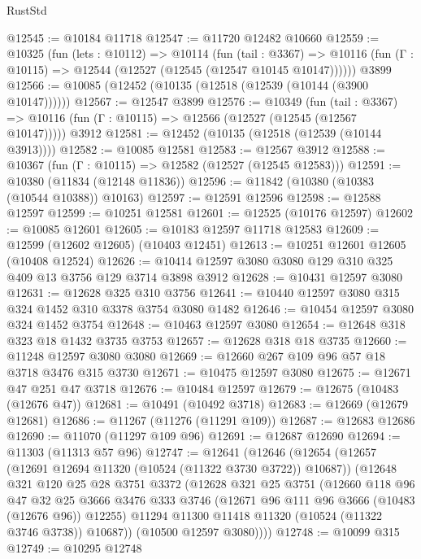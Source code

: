 \begin{lexlean}{RustStd}
\begin{coremodule}
@12545 := @10184 @11718
@12547 := @11720 @12482 @10660
@12559 := @10325
    (fun (lets : @10112) =>
    @10114
      (fun (tail : @3367) =>
      @10116 (fun (Γ : @10115) => @12544 (@12527 (@12545 (@12547 @10145 @10147))))))
    @3899
@12566 := @10085 (@12452 (@10135 (@12518 (@12539 (@10144 (@3900 @10147))))))
@12567 := @12547 @3899
@12576 := @10349
    (fun (tail : @3367) => @10116 (fun (Γ : @10115) => @12566 (@12527 (@12545 (@12567 @10147)))))
    @3912
@12581 := @12452 (@10135 (@12518 (@12539 (@10144 @3913))))
@12582 := @10085 @12581
@12583 := @12567 @3912
@12588 := @10367 (fun (Γ : @10115) => @12582 (@12527 (@12545 @12583)))
@12591 := @10380 (@11834 (@12148 @11836))
@12596 := @11842 (@10380 (@10383 (@10544 @10388)) @10163)
@12597 := @12591 @12596
@12598 := @12588 @12597
@12599 := @10251 @12581
@12601 := @12525 (@10176 @12597)
@12602 := @10085 @12601
@12605 := @10183 @12597 @11718 @12583
@12609 := @12599 (@12602 @12605) (@10403 @12451)
@12613 := @10251 @12601 @12605 (@10408 @12524)
@12626 := @10414 @12597 @3080 @3080 @129 @310 @325 @409 @13 @3756 @129 @3714 @3898 @3912
@12628 := @10431 @12597 @3080
@12631 := @12628 @325 @310 @3756
@12641 := @10440 @12597 @3080 @315 @324 @1452 @310 @3378 @3754 @3080 @1482
@12646 := @10454 @12597 @3080 @324 @1452 @3754
@12648 := @10463 @12597 @3080
@12654 := @12648 @318 @323 @18 @1432 @3735 @3753
@12657 := @12628 @318 @18 @3735
@12660 := @11248 @12597 @3080 @3080
@12669 := @12660 @267 @109 @96 @57 @18 @3718 @3476 @315 @3730
@12671 := @10475 @12597 @3080
@12675 := @12671 @47 @251 @47 @3718
@12676 := @10484 @12597
@12679 := @12675 (@10483 (@12676 @47))
@12681 := @10491 (@10492 @3718)
@12683 := @12669 (@12679 @12681)
@12686 := @11267 (@11276 (@11291 @109))
@12687 := @12683 @12686
@12690 := @11070 (@11297 @109 @96)
@12691 := @12687 @12690
@12694 := @11303 (@11313 @57 @96)
@12747 := @12641
    (@12646
      (@12654
        (@12657 (@12691 @12694 @11320 (@10524 (@11322 @3730 @3722)) @10687))
        (@12648
          @321
          @120
          @25
          @28
          @3751
          @3372
          (@12628
            @321
            @25
            @3751
            (@12660
              @118
              @96
              @47
              @32
              @25
              @3666
              @3476
              @333
              @3746
              (@12671 @96 @111 @96 @3666 (@10483 (@12676 @96)) @12255)
              @11294
              @11300
              @11418
              @11320
              (@10524 (@11322 @3746 @3738))
              @10687))
          (@10500 @12597 @3080))))
@12748 := @10099 @315
@12749 := @10295 @12748

\end{coremodule}
\end{lexlean}
